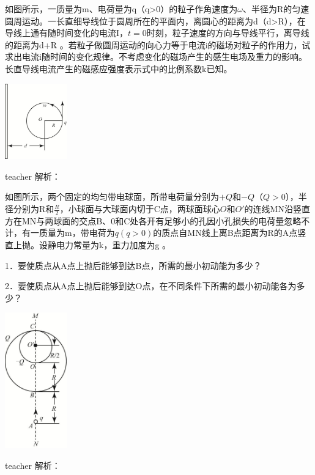 \begin{example}
如图所示，一质量为m、电荷量为q（q>0）的粒子作角速度为$\omega$、半径为R的匀速圆周运动。一长直细导线位于圆周所在的平面内，离圆心的距离为d（d>R），在导线上通有随时间变化的电流I，$t=0$时刻，粒子速度的方向与导线平行，离导线的距离为d+R 。若粒子做圆周运动的向心力等于电流i的磁场对粒子的作用力，试求出电流i随时间的变化规律。不考虑变化的磁场产生的感生电场及重力的影响。长直导线电流产生的磁感应强度表示式中的比例系数k已知。
\begin{flushright}
\includegraphics[width = 0.2\textwidth]{images/problem-5.pdf} 
\end{flushright}
\begin{taggedblock}{teacher}
解析：
\end{taggedblock}
\end{example}

\begin{example}
如图所示，两个固定的均匀带电球面，所带电荷量分别为$+Q$和$-Q$（$Q>0$），半径分别为R和$\frac{R}{2}$，小球面与大球面内切于C点，两球面球心$O$和$O'$的连线MN沿竖直方在MN与两球面的交点B、0和C处各开有足够小的孔因小孔损失的电荷量忽略不计，有一质量为m，带电荷为$q(q>0)$的质点自MN线上离B点距离为R的A点竖直上抛。设静电力常量为k，重力加度为g 。

1．要使质点从A点上抛后能够到达B点，所需的最小初动能为多少？

2．要使质点从A点上抛后能够到达O点，在不同条件下所需的最小初动能各为多少？

\begin{flushright}
\includegraphics[width = 0.2\textwidth]{images/problem-6.pdf} 
\end{flushright}

\begin{taggedblock}{teacher}
解析：
\end{taggedblock}
\end{example}



